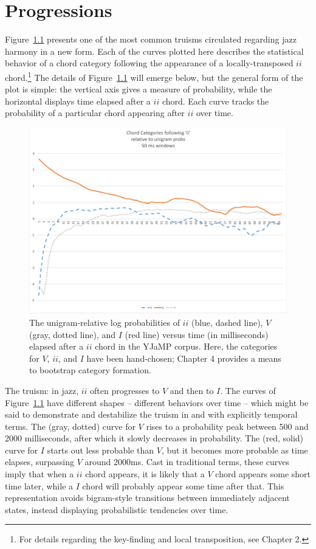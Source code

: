 \chapter{Progressions}

Figure~\ref{iiprog} presents one of the most common truisms circulated regarding jazz harmony in a new form.  Each of the curves plotted here describes the statistical behavior of a chord category following the appearance of a locally-transposed $ii$ chord.\footnote{For details regarding the key-finding and local transposition, see Chapter 2.}  The details of Figure~\ref{iiprog} will emerge below, but the general form of the plot is simple: the vertical axis gives a measure of probability, while the horizontal displays time elapsed after a $ii$ chord.  Each curve tracks the probability of a particular chord appearing after $ii$ over time.

\begin{figure}
	\centering
	\includegraphics[width=5.8in]{iiprogressions.png}
	\caption{The unigram-relative log probabilities of $ii$ (blue, dashed line), $V$ (gray, dotted line), and $I$ (red line) versus time (in milliseconds) elapsed after a $ii$ chord in the YJaMP corpus.  Here, the categories for $V$, $ii$, and $I$ have been hand-chosen; Chapter 4 provides a means to bootstrap category formation.}
	\label{iiprog}
\end{figure}

The truism: in jazz, $ii$ often progresses to $V$ and then to $I$.  The curves of Figure~\ref{iiprog} have different shapes -- different behaviors over time -- which might be said to demonstrate and destabilize the truism in and with explicitly temporal terms.  The (gray, dotted) curve for $V$ rises to a probability peak between 500 and 2000 milliseconds, after which it slowly decreases in probability.  The (red, solid) curve for $I$ starts out less probable than $V$, but it becomes more probable as time elapses, surpassing $V$ around 2000ms.  Cast in traditional terms, these curves imply that when a $ii$ chord appears, it is likely that a $V$ chord appears some short time later, while a $I$ chord will probably appear some time after that.  This representation avoids bigram-style transitions between immediately adjacent states, instead displaying probabilistic tendencies over time.

